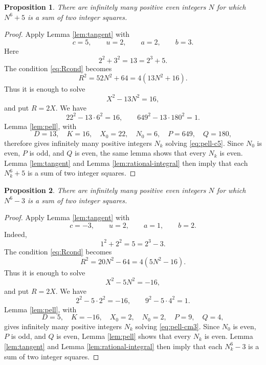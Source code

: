 \documentclass{article}
\theoremstyle{plain}
\newtheorem{proposition}{Proposition}[section]
\theoremstyle{remark}
\theoremstyle{myconjecture}
\theoremstyle{plain}
\theoremstyle{definition}
\numberwithin{equation}{section} %
\begin{document}
\begin{proposition}\label{prop:c5}
There are infinitely many positive even integers \(N\) for which \(N^6+5\) is a
sum of two integer squares.
\end{proposition}

\begin{proof}
Apply Lemma \ref{lem:tangent} with
\[
        c=5,
        \qquad u=2,
        \qquad a=2,
        \qquad b=3.
\]
Here
\[
        2^2+3^2=13=2^3+5.
\]
The condition \eqref{eq:Rcond} becomes
\[
        R^2=52N^2+64=4(13N^2+16).
\]
Thus it is enough to solve
\[
        X^2-13N^2=16,                       \tag{5}\label{eq:pell-c5}
\]
and put \(R=2X\).  We have
\[
        22^2-13\cdot6^2=16,
        \qquad
        649^2-13\cdot180^2=1.
\]
Lemma \ref{lem:pell}, with
\[
        D=13,
        \quad K=16,
        \quad X_0=22,
        \quad N_0=6,
        \quad P=649,
        \quad Q=180,
\]
therefore gives infinitely many positive integers \(N_k\) solving
\eqref{eq:pell-c5}.  Since \(N_0\) is even, \(P\) is odd, and \(Q\) is even,
the same lemma shows that every \(N_k\) is even.  Lemma \ref{lem:tangent} and
Lemma \ref{lem:rational-integral} then imply that each \(N_k^6+5\) is a sum of
two integer squares.
\end{proof}

\begin{proposition}\label{prop:cm3}
There are infinitely many positive even integers \(N\) for which \(N^6-3\) is a
sum of two integer squares.
\end{proposition}

\begin{proof}
Apply Lemma \ref{lem:tangent} with
\[
        c=-3,
        \qquad u=2,
        \qquad a=1,
        \qquad b=2.
\]
Indeed,
\[
        1^2+2^2=5=2^3-3.
\]
The condition \eqref{eq:Rcond} becomes
\[
        R^2=20N^2-64=4(5N^2-16).
\]
Thus it is enough to solve
\[
        X^2-5N^2=-16,                       \tag{6}\label{eq:pell-cm3}
\]
and put \(R=2X\).  We have
\[
        2^2-5\cdot2^2=-16,
        \qquad
        9^2-5\cdot4^2=1.
\]
Lemma \ref{lem:pell}, with
\[
        D=5,
        \quad K=-16,
        \quad X_0=2,
        \quad N_0=2,
        \quad P=9,
        \quad Q=4,
\]
gives infinitely many positive integers \(N_k\) solving
\eqref{eq:pell-cm3}.  Since \(N_0\) is even, \(P\) is odd, and \(Q\) is even,
Lemma \ref{lem:pell} shows that every \(N_k\) is even.  Lemma
\ref{lem:tangent} and Lemma \ref{lem:rational-integral} then imply that each
\(N_k^6-3\) is a sum of two integer squares.
\end{proof}
\end{document}
